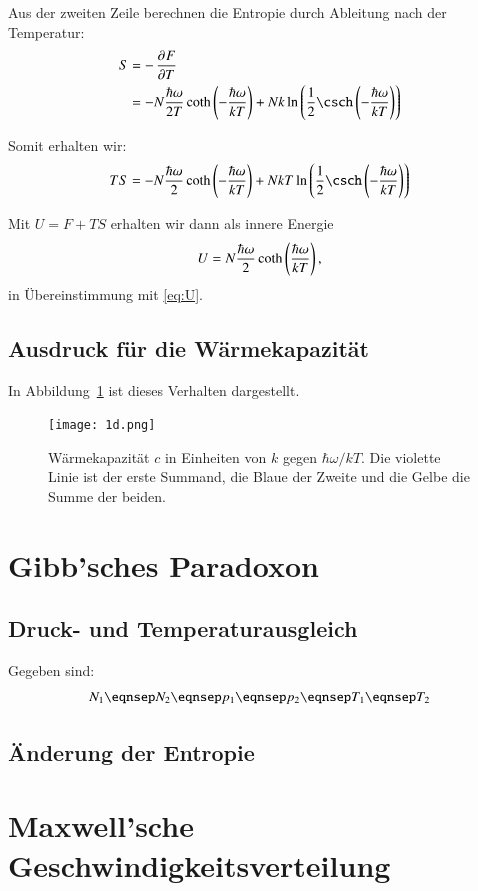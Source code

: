 Aus der zweiten Zeile berechnen die Entropie durch Ableitung nach der Temperatur:
\begin{align*}
    S
    &= - \dpd FT \\
    &= - N \frac{\hbar\omega}{2T} \coth\del{-\frac{\hbar\omega}{kT}} + N k \ln\del{\frac 12 \csch\del{-\frac{\hbar\omega}{kT}}}
\end{align*}

Somit erhalten wir:
\[
    TS = - N \frac{\hbar\omega}{2} \coth\del{-\frac{\hbar\omega}{kT}} + N k T \ln\del{\frac 12 \csch\del{-\frac{\hbar\omega}{kT}}}
\]

Mit $U = F + TS$ erhalten wir dann als innere Energie
\[
    U = N \frac{\hbar\omega}{2} \coth\del{\frac{\hbar\omega}{kT}},
\]
in Übereinstimmung mit \eqref{eq:U}.

\subsection{Ausdruck für die Wärmekapazität}

In Abbildung~\ref{fig:1d-c} ist dieses Verhalten dargestellt.

\begin{figure}[htbp]
    \centering
    \texttt{[image: 1d.png]}
    \caption{%
        Wärmekapazität $c$ in Einheiten von $k$ gegen $\hbar\omega / kT$. Die
        violette Linie ist der erste Summand, die Blaue der Zweite und die
        Gelbe die Summe der beiden.
    }
    \label{fig:1d-c}
\end{figure}

\section{Gibb'sches Paradoxon}

\subsection{Druck- und Temperaturausgleich}

Gegeben sind:
\[
    N_1
    \eqnsep
    N_2
    \eqnsep
    p_1
    \eqnsep
    p_2
    \eqnsep
    T_1
    \eqnsep
    T_2
\]

\subsection{Änderung der Entropie}

\section{Maxwell'sche Geschwindigkeitsverteilung}


\IfFileExists{\bibliographyfile}{
    \printbibliography
}{}



